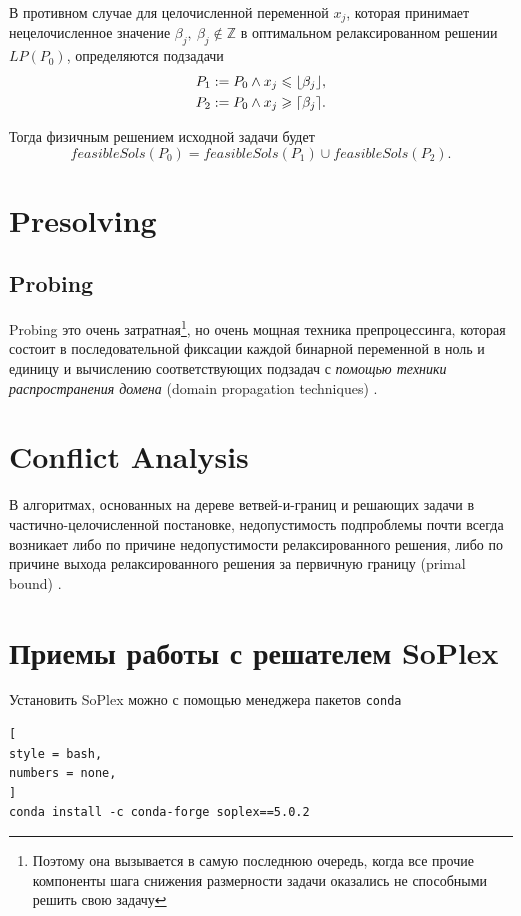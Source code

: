 \documentclass[%
	11pt,
	a4paper,
	utf8,
		]{article}
\begin{document}
В противном случае для целочисленной переменной $ x_j $, которая принимает нецелочисленное значение $ \beta_j, \ \beta_j \notin \mathbb{Z} $ в оптимальном релаксированном решении $ LP(P_0) $, определяются подзадачи
\begin{align*}
	P_1 := P_0 \wedge x_j \leqslant \floor*{\beta_j},\\
	P_2 := P_0 \wedge x_j \geqslant \ceil*{\beta_j}.
\end{align*}

Тогда физичным решением исходной задачи будет
$$
feasibleSols(P_0) = feasibleSols(P_1) \cup feasibleSols(P_2).
$$


\section{Presolving}

\subsection{Probing}

Probing это очень затратная\footnote{Поэтому она вызывается в самую последнюю очередь, когда все прочие компоненты шага снижения размерности задачи оказались не способными решить свою задачу}, но очень мощная техника препроцессинга, которая состоит в последовательной фиксации каждой бинарной переменной в ноль и единицу и вычислению соответствующих подзадач с \emph{помощью техники распространения домена} (domain propagation techniques) \cite[]{achterberg:constr_int_prog}. 

\section{Conflict Analysis}

В алгоритмах, основанных на дереве ветвей-и-границ и решающих задачи в частично-целочисленной постановке, недопустимость подпроблемы почти всегда возникает либо по причине недопустимости релаксированного решения, либо по причине выхода релаксированного решения за первичную границу (primal bound) \cite[]{achterberg:constr_int_prog}. 


\section{Приемы работы с решателем SoPlex}

Установить SoPlex можно с помощью менеджера пакетов \verb|conda|
\begin{lstlisting}[
style = bash,
numbers = none,
]
conda install -c conda-forge soplex==5.0.2 
\end{lstlisting}
\end{document}
